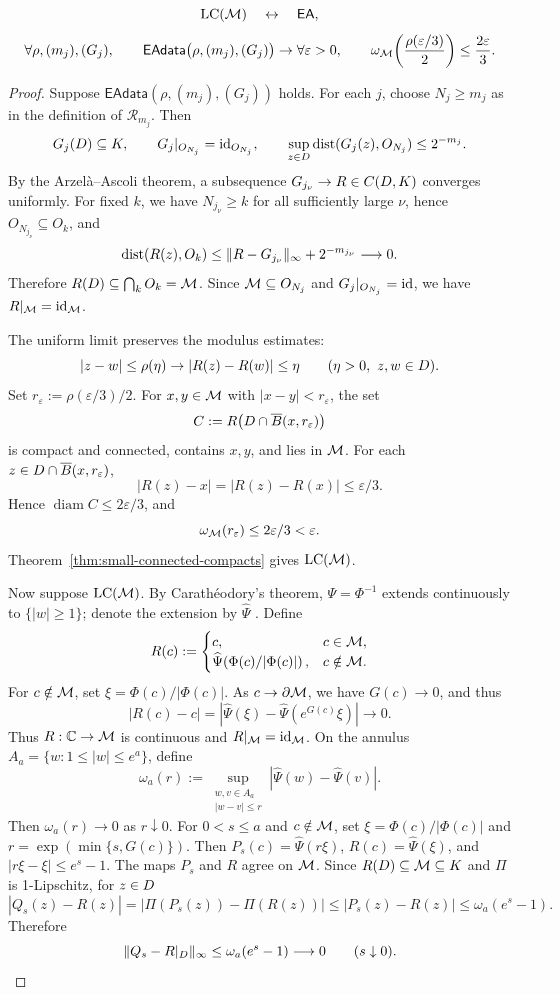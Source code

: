 \begin{proposition}
\label{prop:equicontinuous-selection}
\[
 \operatorname{LC}(\mathcal M)\quad\leftrightarrow\quad\mathsf{EA},
\]
\[
 \forall\rho,(m_j),(G_j),\qquad
 \mathsf{EAdata}\bigl(\rho,(m_j),(G_j)\bigr)
 \to
 \forall\varepsilon>0,\qquad
 \omega_\mathcal M\!\left(\frac{\rho(\varepsilon/3)}2\right)
 \le\frac{2\varepsilon}3.
\]
\end{proposition}
\begin{proof}
Suppose \(\mathsf{EAdata}(\rho,(m_j),(G_j))\) holds. For each \(j\),
choose \(N_j\ge m_j\) as in the definition of \(\mathcal R_{m_j}\).
Then
\[
 G_j(D)\subseteq K,\qquad
 G_j|_{O_{N_j}}=\operatorname{id}_{O_{N_j}},\qquad
 \sup_{z\in D}\operatorname{dist}(G_j(z),O_{N_j})\le2^{-m_j}.
\]
By the Arzelà--Ascoli theorem, a subsequence
\(G_{j_\nu}\to R\in C(D,K)\) converges uniformly. For fixed \(k\),
we have \(N_{j_\nu}\ge k\) for all sufficiently large \(\nu\), hence
\(O_{N_{j_\nu}}\subseteq O_k\), and
\[
 \operatorname{dist}(R(z),O_k)
 \le\|R-G_{j_\nu}\|_\infty+2^{-m_{j_\nu}}
 \longrightarrow0.
\]
Therefore \(R(D)\subseteq\bigcap_kO_k=\mathcal M\). Since
\(\mathcal M\subseteq O_{N_j}\) and \(G_j|_{O_{N_j}}=\operatorname{id}\), we have
\(R|_\mathcal M=\operatorname{id}_\mathcal M\).

The uniform limit preserves the modulus estimates:
\[
 |z-w|\le\rho(\eta)\to|R(z)-R(w)|\le\eta
 \qquad(\eta>0,\ z,w\in D).
\]
Set \(r_\varepsilon:=\rho(\varepsilon/3)/2\). For
\(x,y\in\mathcal M\) with \(|x-y|<r_\varepsilon\), the set
\[
 C:=R\bigl(D\cap\overline B(x,r_\varepsilon)\bigr)
\]
is compact and connected, contains \(x,y\), and lies in \(\mathcal M\). For
each \(z\in D\cap\overline B(x,r_\varepsilon)\),
\[
 |R(z)-x|=|R(z)-R(x)|\le\varepsilon/3.
\]
Hence \(\operatorname{diam}C\le2\varepsilon/3\), and
\[
 \omega_\mathcal M(r_\varepsilon)\le2\varepsilon/3<\varepsilon.
\]
Theorem~\ref{thm:small-connected-compacts} gives \(\operatorname{LC}(\mathcal M)\).

Now suppose \(\operatorname{LC}(\mathcal M)\). By Carathéodory's theorem,
\(\Psi=\Phi^{-1}\) extends continuously to \(\{|w|\ge1\}\); denote
the extension by \(\widehat\Psi\)
\cite[Theorem~16.6]{Milnor}. Define
\[
 R(c):=
 \begin{cases}
  c,&c\in\mathcal M,\\
  \widehat\Psi\!\left(\Phi(c)/|\Phi(c)|\right),&c\notin\mathcal M.
 \end{cases}
\]
For \(c\notin\mathcal M\), set \(\xi=\Phi(c)/|\Phi(c)|\). As
\(c\to\partial\mathcal M\), we have \(G(c)\to0\), and thus
\[
 |R(c)-c|
 =|\widehat\Psi(\xi)-\widehat\Psi(e^{G(c)}\xi)|
 \longrightarrow0.
\]
Thus \(R:\mathbb C\to\mathcal M\) is continuous and \(R|_\mathcal M=\operatorname{id}_\mathcal M\). On the annulus
\(A_a=\{w:1\le|w|\le e^a\}\), define
\[
 \omega_a(r):=
 \sup_{\substack{w,v\in A_a\\|w-v|\le r}}
 |\widehat\Psi(w)-\widehat\Psi(v)|.
\]
Then \(\omega_a(r)\to0\) as \(r\downarrow0\). For \(0<s\le a\) and
\(c\notin\mathcal M\), set
\(\xi=\Phi(c)/|\Phi(c)|\) and \(r=\exp(\min\{s,G(c)\})\). Then
\(P_s(c)=\widehat\Psi(r\xi)\), \(R(c)=\widehat\Psi(\xi)\), and
\(|r\xi-\xi|\le e^s-1\). The maps \(P_s\) and \(R\) agree on \(\mathcal M\).
Since \(R(D)\subseteq\mathcal M\subseteq K\) and \(\Pi\) is 1-Lipschitz, for
\(z\in D\)
\[
 |Q_s(z)-R(z)|
 =|\Pi(P_s(z))-\Pi(R(z))|
 \le|P_s(z)-R(z)|
 \le\omega_a(e^s-1).
\]
Therefore
\[
 \|Q_s-R|_D\|_\infty
 \le\omega_a(e^s-1)\longrightarrow0
 \qquad(s\downarrow0).
\]


\end{proof}
